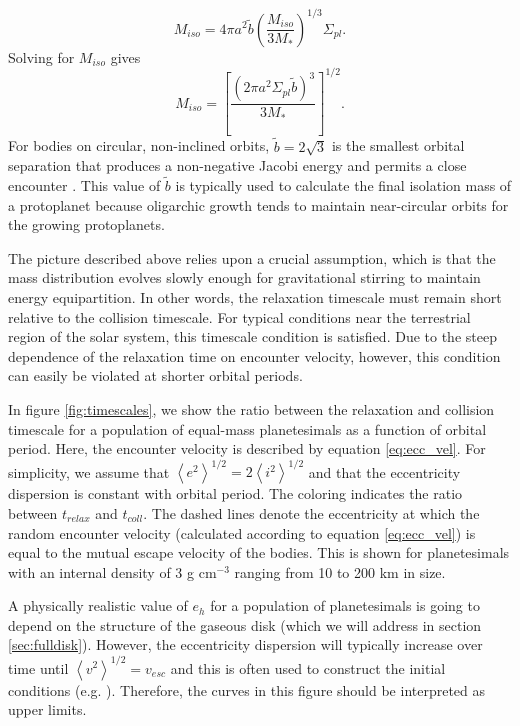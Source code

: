 \begin{equation}\label{eq:iso_mass1}
	M_{iso} = 4 \pi a^{2} \tilde{b} \left(\frac{M_{iso}}{3 M_{*}} \right)^{1/3} \Sigma_{pl}.
\end{equation}
\noindent Solving for $M_{iso}$ gives
\begin{equation}\label{eq:iso}
	M_{iso} = \left[ \frac{\left( 2 \pi a^2 \Sigma_{pl} \tilde{b} \right)^3}{3 M_{*}} \right]^{1/2}.
\end{equation}
\noindent For bodies on circular, non-inclined orbits, $\tilde{b} = 2 \sqrt{3}$ is the smallest orbital separation that produces a non-negative
Jacobi energy and permits a close encounter \cite{naka88}. This value of $\tilde{b}$ is typically used to calculate the final isolation mass of a protoplanet because oligarchic growth tends to maintain near-circular orbits for the growing protoplanets.

The picture described above relies upon a crucial assumption, which
is that the mass distribution evolves slowly enough for gravitational stirring to maintain energy equipartition. In other words, the relaxation timescale must remain short relative to the collision timescale. For typical conditions near the terrestrial region of the solar system, this timescale condition is satisfied. Due to the steep dependence of the relaxation time on encounter velocity, however, this condition can easily be violated at shorter orbital periods.

In figure \ref{fig:timescales}, we show the ratio between the relaxation
and collision timescale for a population of equal-mass planetesimals
as a function of orbital period. Here, the encounter velocity is
described by equation \ref{eq:ecc_vel}. For
simplicity, we assume that $\left< e^2 \right>^{1/2} = 2\left< i^2
\right>^{1/2}$ \cite{ida93a} and that the eccentricity dispersion is
constant with orbital period. The coloring indicates the ratio between
$t_{relax}$ and $t_{coll}$. The dashed lines denote the eccentricity at which the
random encounter velocity (calculated according to equation \ref{eq:ecc_vel}) is
equal to the mutual escape velocity of the bodies. This is shown for planetesimals
with an internal density of 3 g cm$^{-3}$ ranging from 10 to 200 km in size.

A physically realistic value of $e_{h}$ for a population of planetesimals is going to depend on the structure
of the gaseous disk (which we will address in section \ref{sec:fulldisk}). However, the eccentricity
dispersion will typically increase over time until $\left< v^{2} \right>^{1/2} = v_{esc}$ and this is
often used to construct the initial conditions (e.g. \cite{barnes09}). Therefore, the curves in this figure
should be interpreted as upper limits.

